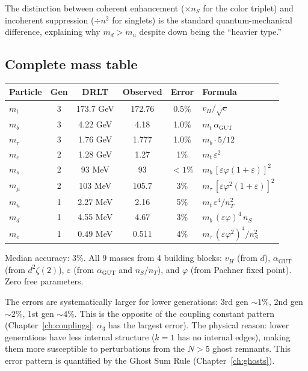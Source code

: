 The distinction between coherent enhancement ($\times n_S$ for the color triplet) and incoherent suppression ($\div n^2$ for singlets) is the standard quantum-mechanical difference, explaining why $m_d > m_u$ despite down being the ``heavier type.''

\subsection{Complete mass table}

\begin{center}
\begin{tabular}{lccccl}
\hline
Particle & Gen & DRLT & Observed & Error & Formula \\
\hline
$m_t$ & 3 & 173.7 GeV & 172.76 & 0.5\% & $v_H/\sqrt{c}$ \\
$m_b$ & 3 & 4.22 GeV & 4.18 & 1.0\% & $m_t\,\alpha_\text{GUT}$ \\
$m_\tau$ & 3 & 1.76 GeV & 1.777 & 1.0\% & $m_b \cdot 5/12$ \\
\hline
$m_c$ & 2 & 1.28 GeV & 1.27 & 1\% & $m_t\,\varepsilon^2$ \\
$m_s$ & 2 & 93 MeV & 93 & $<1\%$ & $m_b\,[\varepsilon\varphi(1+\varepsilon)]^2$ \\
$m_\mu$ & 2 & 103 MeV & 105.7 & 3\% & $m_\tau\,[\varepsilon\varphi^2(1+\varepsilon)]^2$ \\
\hline
$m_u$ & 1 & 2.27 MeV & 2.16 & 5\% & $m_t\,\varepsilon^4/n_T^2$ \\
$m_d$ & 1 & 4.55 MeV & 4.67 & 3\% & $m_b\,(\varepsilon\varphi)^4\,n_S$ \\
$m_e$ & 1 & 0.49 MeV & 0.511 & 4\% & $m_\tau\,(\varepsilon\varphi^2)^4/n_S^2$ \\
\hline
\end{tabular}
\end{center}

Median accuracy: 3\%. All 9 masses from 4 building blocks: $v_H$ (from $d$), $\alpha_\text{GUT}$ (from $d^2\zeta(2)$), $\varepsilon$ (from $\alpha_\text{GUT}$ and $n_S/n_T$), and $\varphi$ (from Pachner fixed point). Zero free parameters.

\begin{remark}
The errors are systematically larger for lower generations: 3rd gen $\sim 1\%$, 2nd gen $\sim 2\%$, 1st gen $\sim 4\%$. This is the opposite of the coupling constant pattern (Chapter~\ref{ch:couplings}: $\alpha_3$ has the largest error). The physical reason: lower generations have less internal structure ($k = 1$ has no internal edges), making them more susceptible to perturbations from the $N > 5$ ghost remnants. This error pattern is quantified by the Ghost Sum Rule (Chapter~\ref{ch:ghosts}).
\end{remark}
